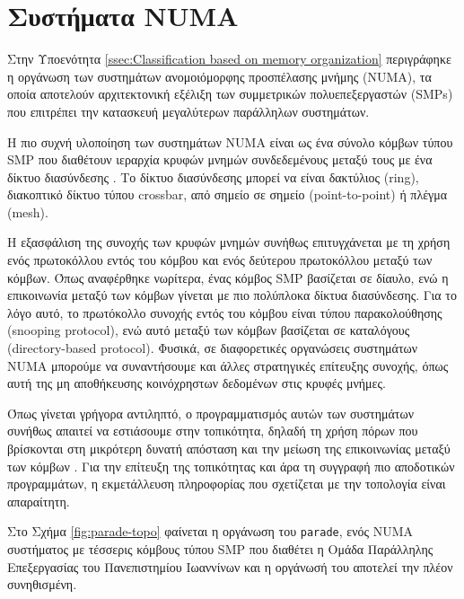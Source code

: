 \section{Συστήματα NUMA}
\label{sec:NUMA Systems}
Στην Υποενότητα \ref{ssec:Classification based on memory organization} περιγράφηκε η οργάνωση των συστημάτων ανομοιόμορφης προσπέλασης μνήμης (NUMA), τα οποία αποτελούν αρχιτεκτονική εξέλιξη των συμμετρικών πολυεπεξεργαστών (SMPs) που επιτρέπει την κατασκευή μεγαλύτερων παράλληλων συστημάτων.

Η πιο συχνή υλοποίηση των συστημάτων NUMA είναι ως ένα σύνολο κόμβων τύπου SMP που διαθέτουν ιεραρχία κρυφών μνημών συνδεδεμένους μεταξύ τους με ένα δίκτυο διασύνδεσης \cite{dobson2003linux}. Το δίκτυο διασύνδεσης μπορεί να είναι δακτύλιος (ring), διακοπτικό δίκτυο τύπου crossbar, από σημείο σε σημείο (point-to-point) ή πλέγμα (mesh).

Η εξασφάλιση της συνοχής των κρυφών μνημών συνήθως επιτυγχάνεται με τη χρήση ενός πρωτοκόλλου εντός του κόμβου και ενός δεύτερου πρωτοκόλλου μεταξύ των κόμβων. Όπως αναφέρθηκε νωρίτερα, ένας κόμβος SMP βασίζεται σε δίαυλο, ενώ η επικοινωνία μεταξύ των κόμβων γίνεται με πιο πολύπλοκα δίκτυα διασύνδεσης. Για το λόγο αυτό, το πρωτόκολλο συνοχής εντός του κόμβου είναι τύπου παρακολούθησης (snooping protocol), ενώ αυτό μεταξύ των κόμβων βασίζεται σε καταλόγους (directory-based protocol). Φυσικά, σε διαφορετικές οργανώσεις συστημάτων NUMA μπορούμε να συναντήσουμε και άλλες στρατηγικές επίτευξης συνοχής, όπως αυτή της μη αποθήκευσης κοινόχρηστων δεδομένων στις κρυφές μνήμες.

Όπως γίνεται γρήγορα αντιληπτό, ο προγραμματισμός αυτών των συστημάτων συνήθως απαιτεί να εστιάσουμε στην τοπικότητα, δηλαδή τη χρήση πόρων που βρίσκονται στη μικρότερη δυνατή απόσταση και την μείωση της επικοινωνίας μεταξύ των κόμβων \cite{bligh2004linux}. Για την επίτευξη της τοπικότητας και άρα τη συγγραφή πιο αποδοτικών προγραμμάτων, η εκμετάλλευση πληροφορίας που σχετίζεται με την τοπολογία είναι απαραίτητη.

Στο Σχήμα \ref{fig:parade-topo} φαίνεται η οργάνωση του \texttt{parade}, ενός NUMA συστήματος με τέσσερις κόμβους τύπου SMP που διαθέτει η Ομάδα Παράλληλης Επεξεργασίας του Πανεπιστημίου Ιωαννίνων και η οργάνωσή του αποτελεί την πλέον συνηθισμένη.

